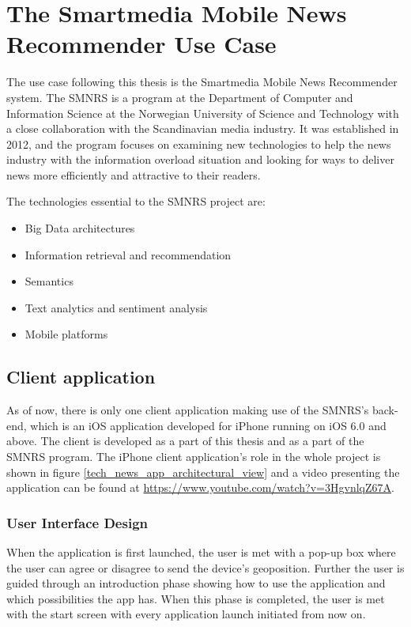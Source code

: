 \chapter{The Smartmedia Mobile News Recommender Use Case}
\label{chapter_usecase}

The use case following this thesis is the Smartmedia Mobile News Recommender system. The SMNRS is a program at the Department of Computer and Information Science at the Norwegian University of Science and Technology with a close collaboration with the Scandinavian media industry. It was established in 2012, and the program focuses on examining new technologies to help the news industry with the information overload situation and looking for ways to deliver news more efficiently and attractive to their readers.

The technologies essential to the SMNRS project are:

\begin{itemize}
	\item Big Data architectures
	\item Information retrieval and recommendation
	\item Semantics
	\item Text analytics and sentiment analysis
	\item Mobile platforms
\end{itemize}

\section{Client application}
\label{use_case_application}
As of now, there is only one client application making use of the SMNRS's back-end, which is an iOS application developed for iPhone running on iOS 6.0 and above. The client is developed as a part of this thesis and as a part of the SMNRS program. The iPhone client application's role in the whole project is shown in figure \ref{tech_news_app_architectural_view} and a video presenting the application can be found at \url{https://www.youtube.com/watch?v=3HgvnlqZ67A}.

\subsection{User Interface Design}
When the application is first launched, the user is met with a pop-up box where the user can agree or disagree to send the device's geoposition. Further the user is guided through an introduction phase showing how to use the application and which possibilities the app has. When this phase is completed, the user is met with the start screen with every application launch initiated from now on.

